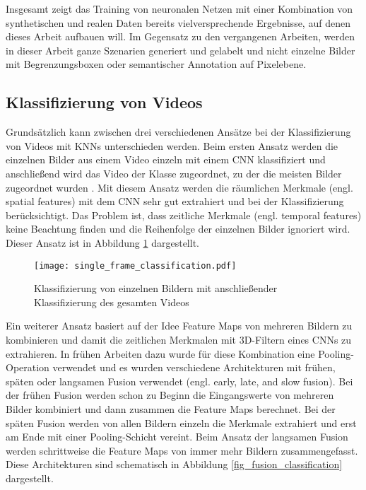 Insgesamt zeigt das Training von neuronalen Netzen mit einer Kombination von synthetischen und realen Daten bereits vielversprechende Ergebnisse, auf denen dieses Arbeit aufbauen will. Im Gegensatz zu den vergangenen Arbeiten, werden in dieser Arbeit ganze Szenarien generiert und gelabelt und nicht einzelne Bilder mit Begrenzungsboxen oder semantischer Annotation auf Pixelebene.


\subsection{Klassifizierung von Videos}
\label{grundlagen_nn_video}

Grundsätzlich kann zwischen drei verschiedenen Ansätze bei der Klassifizierung von Videos mit \acp{KNN} unterschieden werden. Beim ersten Ansatz werden die einzelnen Bilder aus einem Video einzeln mit einem \ac{CNN} klassifiziert und anschließend wird das Video der Klasse zugeordnet, zu der die meisten Bilder zugeordnet wurden \cite{karpathy2014large}. Mit diesem Ansatz werden die räumlichen Merkmale (engl. spatial features) mit dem \ac{CNN} sehr gut extrahiert und bei der Klassifizierung berücksichtigt. Das Problem ist, dass zeitliche Merkmale (engl. temporal features) keine Beachtung finden und die Reihenfolge der einzelnen Bilder ignoriert wird. Dieser Ansatz ist in Abbildung \ref{fig_single_frame_classification} dargestellt.

\begin{figure}[h]
\centering
\texttt{[image: single\_frame\_classification.pdf]}
\caption{Klassifizierung von einzelnen Bildern mit anschließender Klassifizierung des gesamten Videos}
\label{fig_single_frame_classification}
\end{figure}

Ein weiterer Ansatz basiert auf der Idee Feature Maps von mehreren Bildern zu kombinieren und damit die zeitlichen Merkmalen mit 3D-Filtern eines \acp{CNN} zu extrahieren. In frühen Arbeiten dazu wurde für diese Kombination eine Pooling-Operation verwendet \cite{karpathy2014large, yue2015beyond} und es wurden verschiedene Architekturen mit frühen, späten oder langsamen Fusion verwendet (engl. early, late, and slow fusion). Bei der frühen Fusion werden schon zu Beginn die Eingangswerte von mehreren Bilder kombiniert und dann zusammen die Feature Maps berechnet. Bei der späten Fusion werden von allen Bildern einzeln die Merkmale extrahiert und erst am Ende mit einer Pooling-Schicht vereint. Beim Ansatz der langsamen Fusion werden schrittweise die Feature Maps von immer mehr Bildern zusammengefasst. Diese Architekturen sind schematisch in Abbildung \ref{fig_fusion_classification} dargestellt.

